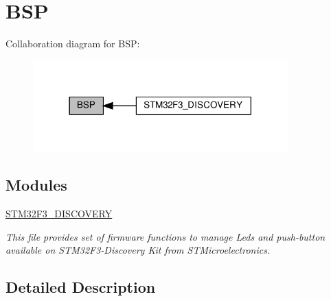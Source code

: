 \hypertarget{group__BSP}{}\section{B\+SP}
\label{group__BSP}
Collaboration diagram for B\+SP\+:\nopagebreak
\begin{figure}[H]
\begin{center}
\leavevmode
\includegraphics[width=278pt]{group__BSP}
\end{center}
\end{figure}
\subsection*{Modules}
\begin{DoxyCompactItemize}
\item 
\hyperlink{group__STM32F3__DISCOVERY}{S\+T\+M32\+F3\+\_\+\+D\+I\+S\+C\+O\+V\+E\+RY}
\begin{DoxyCompactList}\small\item\em This file provides set of firmware functions to manage Leds and push-\/button available on S\+T\+M32\+F3-\/\+Discovery Kit from S\+T\+Microelectronics. \end{DoxyCompactList}\end{DoxyCompactItemize}


\subsection{Detailed Description}
